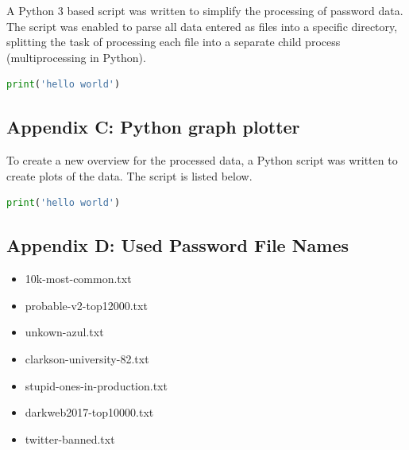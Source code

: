 \documentclass[a4paper,12pt]{article}
\begin{document}
A Python 3 based script was written to simplify the processing of password data. The script was enabled to parse all data entered as files into a specific directory, splitting the task of processing each file into a separate child process (multiprocessing in Python). 

\begin{lstlisting}[language=Python]
  print('hello world')  
\end{lstlisting}

\subsection{Appendix C: Python graph plotter}
\label{app:pyplot}

To create a new overview for the processed data, a Python script was written to create plots of the data. The script is listed below.

\begin{lstlisting}[language=Python]
  print('hello world')  
\end{lstlisting}

\subsection{Appendix D: Used Password File Names}
\label{app:pwordfile}

\begin{itemize}
\item 10k-most-common.txt
\item probable-v2-top12000.txt
\item unkown-azul.txt
\item clarkson-university-82.txt
\item stupid-ones-in-production.txt
\item darkweb2017-top10000.txt
\item twitter-banned.txt
\end{itemize}
\end{document}
